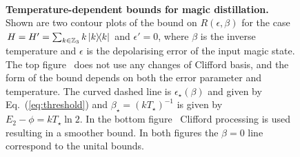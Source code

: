 \documentclass[pra,
aps,
twocolumn,
superscriptaddress,
groupedaddress,
nofootinbib,
reprint
]{revtex4-1}
\begin{document}
\begin{figure}[t!]
    \centering
    \\
    \caption{\textbf{Temperature-dependent bounds for magic distillation.} Shown are two contour plots of the bound on $R(\epsilon, \beta)$ for the case $H = H' = \sum_{k \in \mathbb{Z}_3} k \ketbra{k}$ and $\epsilon' = 0$, where $\beta$ is the inverse temperature and $\epsilon$ is the depolarising error of the input magic state. 
The top figure~ does not use any changes of Clifford basis, and the form of the bound depends on both the error parameter and temperature. The curved dashed line is $\epsilon_\star(\beta)$ and given by Eq.~(\ref{eq:threshold}) and $\beta_\star = (kT_\star)^{-1}$ is given by $E_2-\phi = kT_\star \ln 2$. 
In the bottom figure~ Clifford processing is used resulting in a smoother bound. In both figures the $\beta = 0$ line correspond to the unital bounds.}
    \label{fig:rate_contour}
\end{figure}
\end{document}
